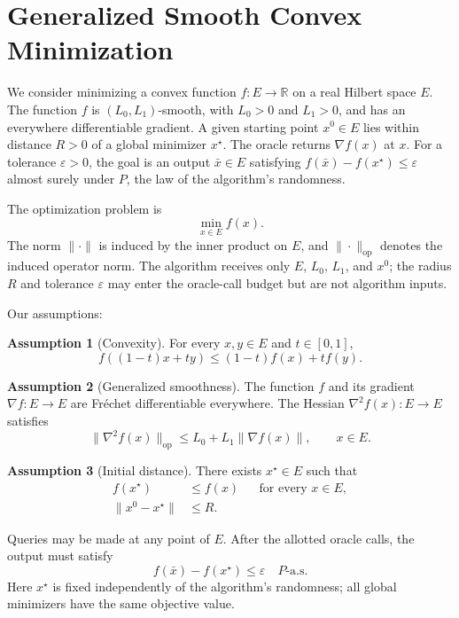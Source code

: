 \documentclass[10pt]{article}
\theoremstyle{definition}
\newtheorem{assumption}{Assumption}
\begin{document}
\section*{Generalized Smooth Convex Minimization}
We consider minimizing a convex function $f:E\to\mathbb{R}$ on a real Hilbert space $E$. The function $f$ is $(L_0,L_1)$-smooth, with $L_0>0$ and $L_1>0$, and has an everywhere differentiable gradient. A given starting point $x^0\in E$ lies within distance $R>0$ of a global minimizer $x^\star$. The oracle returns $\nabla f(x)$ at $x$. For a tolerance $\varepsilon>0$, the goal is an output $\bar{x}\in E$ satisfying $f(\bar{x})-f(x^\star)\leq\varepsilon$ almost surely under $P$, the law of the algorithm's randomness.

The optimization problem is
\[
\min_{x\in E} f(x).
\]
The norm $\|\cdot\|$ is induced by the inner product on $E$, and $\|\cdot\|_{\mathrm{op}}$ denotes the induced operator norm. The algorithm receives only $E$, $L_0$, $L_1$, and $x^0$; the radius $R$ and tolerance $\varepsilon$ may enter the oracle-call budget but are not algorithm inputs.

Our assumptions:
\begin{assumption}[Convexity]
For every $x,y\in E$ and $t\in[0,1]$,
\[
f((1-t)x+ty)\leq (1-t)f(x)+t f(y).
\]
\end{assumption}

\begin{assumption}[Generalized smoothness]
The function $f$ and its gradient $\nabla f:E\to E$ are Fr\'echet differentiable everywhere. The Hessian $\nabla^2 f(x):E\to E$ satisfies
\[
\|\nabla^2 f(x)\|_{\mathrm{op}}
\leq L_0+L_1\|\nabla f(x)\|,
\qquad x\in E.
\]
\end{assumption}

\begin{assumption}[Initial distance]
There exists $x^\star\in E$ such that
\[
\begin{aligned}
f(x^\star)&\leq f(x) &&\text{for every }x\in E,\\
\|x^0-x^\star\|&\leq R.
\end{aligned}
\]
\end{assumption}

Queries may be made at any point of $E$. After the allotted oracle calls, the output must satisfy
\[
f(\bar{x})-f(x^\star)\leq\varepsilon
\quad P\text{-a.s.}
\]
Here $x^\star$ is fixed independently of the algorithm's randomness; all global minimizers have the same objective value.
\end{document}
